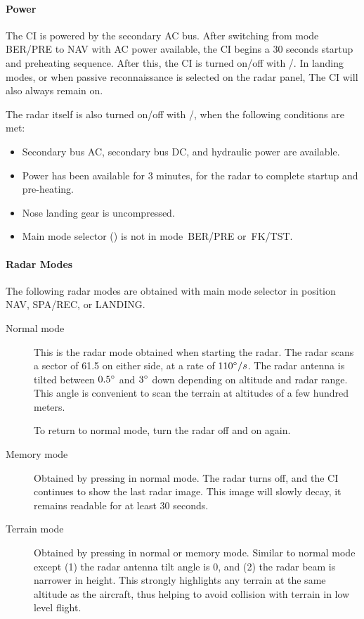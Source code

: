 \paragraph{Power}
The CI is powered by the secondary AC bus.
After switching from mode BER/PRE to NAV with AC power available,
the CI begins a 30 seconds startup and preheating sequence.
After this, the CI is turned on/off with /.
In landing modes, or when passive reconnaissance is selected on the radar panel,
The CI will also always remain on.

The radar itself is also turned on/off with /,
when the following conditions are met:
\begin{itemize}[nosep]
  \item Secondary bus AC, secondary bus DC, and hydraulic power are available.
  \item Power has been available for 3 minutes, for the radar to complete startup and pre-heating.
  \item Nose landing gear is uncompressed.
  \item Main mode selector () is not in mode~BER/PRE or~FK/TST.
\end{itemize}

\paragraph{Radar Modes}
The following radar modes are obtained with main mode selector in position NAV, SPA/REC, or LANDING.
\begin{description}
  \item[Normal mode]
    This is the radar mode obtained when starting the radar.
    The radar scans a sector of 61.5\textdegree{} on either side, at a rate of $110\degree{}/s$.
    The radar antenna is tilted between $0.5\degree{}$ and $3\degree{}$ down
    depending on altitude and radar range.
    This angle is convenient to scan the terrain at altitudes of a few hundred meters.

    To return to normal mode, turn the radar off and on again.
  \item[Memory mode]
    Obtained by pressing  in normal mode.
    The radar turns off, and the CI continues to show the last radar image.
    This image will slowly decay, it remains readable for at least 30 seconds.
  \item[Terrain mode]
    Obtained by pressing  in normal or memory mode.
    Similar to normal mode except (1) the radar antenna tilt angle is 0\textdegree{},
    and (2) the radar beam is narrower in height.
    This strongly highlights any terrain at the same altitude as the aircraft,
    thus helping to avoid collision with terrain in low level flight.
\end{description}

